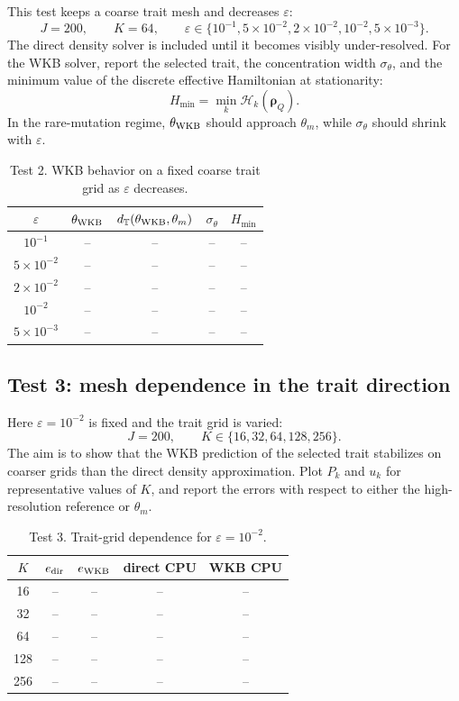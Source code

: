 \documentclass[11pt]{article}
\begin{document}
This test keeps a coarse trait mesh and decreases \(\varepsilon\):
\[
    J=200,
    \qquad
    K=64,
    \qquad
    \varepsilon\in
    \{10^{-1},5\times10^{-2},2\times10^{-2},10^{-2},5\times10^{-3}\} .
\]
The direct density solver is included until it becomes visibly under-resolved.
For the WKB solver, report the selected trait, the concentration width
\(\sigma_\theta\), and the minimum value of the discrete effective Hamiltonian
at stationarity:
\[
    H_{\min}=\min_k\mathcal H_k(\boldsymbol\rho_Q).
\]
In the rare-mutation regime, \(\theta_{\rm WKB}\) should approach
\(\theta_m\), while \(\sigma_\theta\) should shrink with \(\varepsilon\).

\begin{table}[h]
\centering
\caption{Test 2. WKB behavior on a fixed coarse trait grid as
\(\varepsilon\) decreases.}
\label{tab:test2_small_eps}
\begin{tabular}{ccccc}
\toprule
\(\varepsilon\) & \(\theta_{\rm WKB}\) & \(d_{\mathbb T}(\theta_{\rm WKB},\theta_m)\) & \(\sigma_\theta\) & \(H_{\min}\) \\
\midrule
\(10^{-1}\)        & -- & -- & -- & -- \\
\(5\times10^{-2}\) & -- & -- & -- & -- \\
\(2\times10^{-2}\) & -- & -- & -- & -- \\
\(10^{-2}\)        & -- & -- & -- & -- \\
\(5\times10^{-3}\) & -- & -- & -- & -- \\
\bottomrule
\end{tabular}
\end{table}

\subsection{Test 3: mesh dependence in the trait direction}

Here \(\varepsilon=10^{-2}\) is fixed and the trait grid is varied:
\[
    J=200,
    \qquad
    K\in\{16,32,64,128,256\} .
\]
The aim is to show that the WKB prediction of the selected trait stabilizes on
coarser grids than the direct density approximation. Plot
\(P_k\) and \(u_k\) for representative values of \(K\), and report the errors
with respect to either the high-resolution reference or \(\theta_m\).

\begin{table}[h]
\centering
\caption{Test 3. Trait-grid dependence for \(\varepsilon=10^{-2}\).}
\label{tab:test3_mesh_dependence}
\begin{tabular}{ccccc}
\toprule
\(K\) & \(e_{\rm dir}\) & \(e_{\rm WKB}\) & direct CPU & WKB CPU \\
\midrule
16  & -- & -- & -- & -- \\
32  & -- & -- & -- & -- \\
64  & -- & -- & -- & -- \\
128 & -- & -- & -- & -- \\
256 & -- & -- & -- & -- \\
\bottomrule
\end{tabular}
\end{table}
\end{document}
